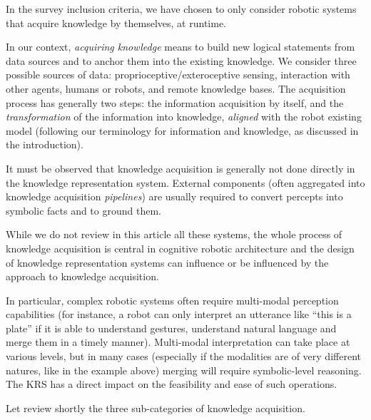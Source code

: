 \documentclass[a4paper, twocolumn]{article}
\begin{document}
In the survey inclusion criteria, we have chosen to only consider robotic
systems that acquire knowledge by themselves, at runtime.

In our context, \emph{acquiring knowledge} means to build new logical
statements from data sources and to anchor them into the existing knowledge. We
consider three possible sources of data: proprioceptive/exteroceptive sensing,
interaction with other agents, humans or robots, and remote knowledge bases.
The acquisition process has generally two steps: the information acquisition by
itself, and the \emph{transformation} of the information into knowledge,
\emph{aligned} with the robot existing model (following our terminology for
information and knowledge, as discussed in the introduction).

It must be observed that knowledge acquisition is generally not done directly
in the knowledge representation system. External components (often aggregated
into knowledge acquisition \emph{pipelines}) are usually required to convert
percepts into symbolic facts and to ground them.

While we do not review in this article all these systems, the whole process of
knowledge acquisition is central in cognitive robotic architecture and the
design of knowledge representation systems can influence or be influenced by
the approach to knowledge acquisition.

In particular, complex robotic systems often require multi-modal perception
capabilities (for instance, a robot can only interpret an utterance like ``this
is a plate'' if it is able to understand gestures, understand natural language
and merge them in a timely manner). Multi-modal interpretation can take place
at various levels, but in many cases (especially if the modalities are of very
different natures, like in the example above) merging will require
symbolic-level reasoning. The KRS has a direct impact on the feasibility and
ease of such operations.

Let review shortly the three sub-categories of knowledge acquisition.

\begin{scriptsize}
\begin{center}
\end{center}
\end{scriptsize}
\end{document}
